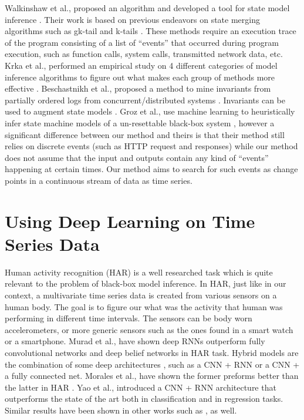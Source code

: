 Walkinshaw et al., proposed an algorithm and developed a tool for state model inference \cite{walkinshaw2016inferring}. Their work is based on previous endeavors on state merging algorithms such as gk-tail and k-tails \cite{lorenzoli2008automatic, biermann1972synthesis}. These methods require an execution trace of the program consisting of a list of ``events'' that occurred during program execution, such as function calls, system calls, transmitted network data, etc. Krka et al., performed an empirical study on 4 different categories of model inference algorithms to figure out what makes each group of methods more effective \cite{krka2014automatic}. Beschastnikh et al., proposed a method to mine invariants from partially ordered logs from concurrent/distributed systems \cite{beschastnikh2011mining}. Invariants can be used to augment state models \cite{beschastnikh2014inferring, beschastnikh2011leveraging}. Groz et al., use machine learning to heuristically infer state machine models of a un-resettable black-box system \cite{groz2018revisiting}, however a significant difference between our method and theirs is that their method still relies on discrete events (such as HTTP request and responses) while our method does not assume that the input and outputs contain any kind of ``events'' happening at certain times. Our method aims to search for such events as change points in a continuous stream of data as time series. %


\section{Using Deep Learning on Time Series Data} \label{sec:related_work_har}
Human activity recognition (HAR) is a well researched task which is quite relevant to the problem of black-box model inference. In HAR, just like in our context, a multivariate time series data is created from various sensors on a human body. The goal is to figure our what was the activity that human was performing in different time intervals. The sensors can be body worn accelerometers, or more generic sensors such as the ones found in a smart watch or a smartphone. 
Murad et al., \cite{murad2017deep} have shown deep RNNs outperform fully convolutional networks and deep belief networks in HAR task.
Hybrid models are the combination of some deep architectures \cite{wang2019deep}, such as a CNN + RNN or a CNN + a fully connected net. Morales et al., have shown the former preforms better than the latter in HAR \cite{morales2016deep}. Yao et al., \cite{deepsense} introduced a CNN + RNN architecture that outperforms the state of the art both in classification and in regression tasks. Similar results have been shown in other works such as \cite{Ordonez2016, singh2017transforming, zheng2016exploiting}, as well.

